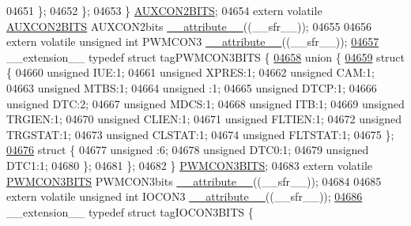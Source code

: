 \begin{DoxyCode}
04651     \};
04652   \};
04653 \} \hyperlink{a00008_db/d57/a00112}{AUXCON2BITS};
04654 \textcolor{keyword}{extern} \textcolor{keyword}{volatile} \hyperlink{a00008_db/d57/a00112}{AUXCON2BITS} AUXCON2bits \hyperlink{a00009_a493c46f03454991ccc5aa7a6e1dfb2a7}{\_\_attribute\_\_}((\_\_sfr\_\_));
04655 
04656 \textcolor{keyword}{extern} \textcolor{keyword}{volatile} \textcolor{keywordtype}{unsigned} \textcolor{keywordtype}{int}  PWMCON3 \hyperlink{a00009_a493c46f03454991ccc5aa7a6e1dfb2a7}{\_\_attribute\_\_}((\_\_sfr\_\_));
\hypertarget{a00009_source_l04657}{}\hyperlink{a00008}{04657} \_\_extension\_\_ \textcolor{keyword}{typedef} \textcolor{keyword}{struct }tagPWMCON3BITS \{
\hypertarget{a00009_source_l04658}{}\hyperlink{a00009}{04658}   \textcolor{keyword}{union }\{
\hypertarget{a00009_source_l04659}{}\hyperlink{a00009}{04659}     \textcolor{keyword}{struct }\{
04660       \textcolor{keywordtype}{unsigned} IUE:1;
04661       \textcolor{keywordtype}{unsigned} XPRES:1;
04662       \textcolor{keywordtype}{unsigned} CAM:1;
04663       \textcolor{keywordtype}{unsigned} MTBS:1;
04664       \textcolor{keywordtype}{unsigned} :1;
04665       \textcolor{keywordtype}{unsigned} DTCP:1;
04666       \textcolor{keywordtype}{unsigned} DTC:2;
04667       \textcolor{keywordtype}{unsigned} MDCS:1;
04668       \textcolor{keywordtype}{unsigned} ITB:1;
04669       \textcolor{keywordtype}{unsigned} TRGIEN:1;
04670       \textcolor{keywordtype}{unsigned} CLIEN:1;
04671       \textcolor{keywordtype}{unsigned} FLTIEN:1;
04672       \textcolor{keywordtype}{unsigned} TRGSTAT:1;
04673       \textcolor{keywordtype}{unsigned} CLSTAT:1;
04674       \textcolor{keywordtype}{unsigned} FLTSTAT:1;
04675     \};
\hypertarget{a00009_source_l04676}{}\hyperlink{a00009}{04676}     \textcolor{keyword}{struct }\{
04677       \textcolor{keywordtype}{unsigned} :6;
04678       \textcolor{keywordtype}{unsigned} DTC0:1;
04679       \textcolor{keywordtype}{unsigned} DTC1:1;
04680     \};
04681   \};
04682 \} \hyperlink{a00008_da/d31/a00678}{PWMCON3BITS};
04683 \textcolor{keyword}{extern} \textcolor{keyword}{volatile} \hyperlink{a00008_da/d31/a00678}{PWMCON3BITS} PWMCON3bits \hyperlink{a00009_a493c46f03454991ccc5aa7a6e1dfb2a7}{\_\_attribute\_\_}((\_\_sfr\_\_));
04684 
04685 \textcolor{keyword}{extern} \textcolor{keyword}{volatile} \textcolor{keywordtype}{unsigned} \textcolor{keywordtype}{int}  IOCON3 \hyperlink{a00009_a493c46f03454991ccc5aa7a6e1dfb2a7}{\_\_attribute\_\_}((\_\_sfr\_\_));
\hypertarget{a00009_source_l04686}{}\hyperlink{a00008}{04686} \_\_extension\_\_ \textcolor{keyword}{typedef} \textcolor{keyword}{struct }tagIOCON3BITS \{

\end{DoxyCode}
